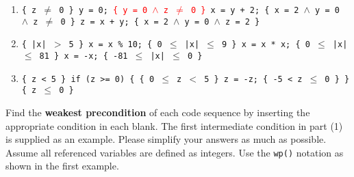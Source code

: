 \documentclass[11pt]{article}
\begin{document}
\begin{enumerate}
\item \texttt{\{ z $\neq$ 0 \}
\newline
y = 0;
\newline
\hspace*{0.5cm} \textcolor{red}{\{ y = 0 $\land$  z $\neq$ 0 \}}
\newline
x = y + 2;
\newline
\hspace*{0.5cm}\{ x = 2 $\land$ y = 0 $\land$ z $\neq$ 0 \} %
\newline
z = x + y;
\newline
\{  x = 2 $\land$ y = 0 $\land$ z = 2 \}
\newline
}

\newpage
\item \texttt{\{ |x| $>$ 5 \}
\newline
x = x \% 10;
\newline
\hspace*{0.5cm}\{ 0 $\leq$ |x| $\leq$ 9 \}
\newline
x = x * x;
\newline
\hspace*{0.5cm}\{ 0 $\leq$ |x| $\leq$ 81 \}
\newline
x = -x;
\newline
\{ -81 $\leq$ |x| $\leq$ 0 \}
}

\item \texttt{\{ z < 5 \}
\newline
if (z >= 0) \{
\newline
\hspace*{0.5cm}\{ 0 $\leq$ z $<$ 5 \}
\newline
z = -z;
\newline
\hspace*{0.5cm}\{ -5 < z $\leq$ 0 \}
\newline
\}
\newline
\{ z $\leq$ 0 \}
\newline
}
\end{enumerate}

\newline
\noindent Find the \textbf{weakest precondition} of each code sequence by inserting the appropriate condition in each blank. The first intermediate condition in part (1) is supplied as an example.
Please simplify your answers as much as possible. Assume all referenced variables are defined as integers. Use the \verb*|wp()| notation as shown in the first example.
\end{document}
